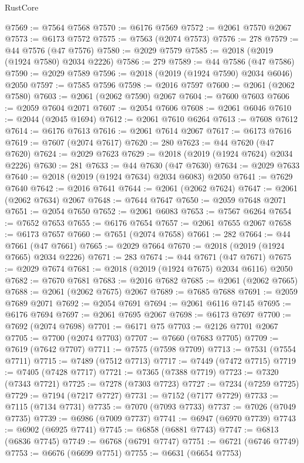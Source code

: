 \begin{lexlean}{RustCore}
\begin{coremodule}
@7569 := @7564 @7568
@7570 := @6176 @7569
@7572 := @2061 @7570 @2067
@7573 := @6173 @7572
@7575 := @7563 (@2074 @7573)
@7576 := 278
@7579 := @44 @7576 (@47 @7576)
@7580 := @2029 @7579
@7585 := @2018 (@2019 (@1924 @7580) @2034 @2226)
@7586 := 279
@7589 := @44 @7586 (@47 @7586)
@7590 := @2029 @7589
@7596 := @2018 (@2019 (@1924 @7590) @2034 @6046) @2050
@7597 := @7585 @7596
@7598 := @2016 @7597
@7600 := @2061 (@2062 @7580)
@7603 := @2061 (@2062 @7590) @2067
@7604 := @7600 @7603
@7606 := @2059 @7604 @2071
@7607 := @2054 @7606
@7608 := @2061 @6046
@7610 := @2044 (@2045 @1694)
@7612 := @2061 @7610 @6264
@7613 := @7608 @7612
@7614 := @6176 @7613
@7616 := @2061 @7614 @2067
@7617 := @6173 @7616
@7619 := @7607 (@2074 @7617)
@7620 := 280
@7623 := @44 @7620 (@47 @7620)
@7624 := @2029 @7623
@7629 := @2018 (@2019 (@1924 @7624) @2034 @2226)
@7630 := 281
@7633 := @44 @7630 (@47 @7630)
@7634 := @2029 @7633
@7640 := @2018 (@2019 (@1924 @7634) @2034 @6083) @2050
@7641 := @7629 @7640
@7642 := @2016 @7641
@7644 := @2061 (@2062 @7624)
@7647 := @2061 (@2062 @7634) @2067
@7648 := @7644 @7647
@7650 := @2059 @7648 @2071
@7651 := @2054 @7650
@7652 := @2061 @6083
@7653 := @7567 @6264
@7654 := @7652 @7653
@7655 := @6176 @7654
@7657 := @2061 @7655 @2067
@7658 := @6173 @7657
@7660 := @7651 (@2074 @7658)
@7661 := 282
@7664 := @44 @7661 (@47 @7661)
@7665 := @2029 @7664
@7670 := @2018 (@2019 (@1924 @7665) @2034 @2226)
@7671 := 283
@7674 := @44 @7671 (@47 @7671)
@7675 := @2029 @7674
@7681 := @2018 (@2019 (@1924 @7675) @2034 @6116) @2050
@7682 := @7670 @7681
@7683 := @2016 @7682
@7685 := @2061 (@2062 @7665)
@7688 := @2061 (@2062 @7675) @2067
@7689 := @7685 @7688
@7691 := @2059 @7689 @2071
@7692 := @2054 @7691
@7694 := @2061 @6116 @7145
@7695 := @6176 @7694
@7697 := @2061 @7695 @2067
@7698 := @6173 @7697
@7700 := @7692 (@2074 @7698)
@7701 := @6171 @75
@7703 := @2126 @7701 @2067
@7705 := @7700 (@2074 @7703)
@7707 := @7660 (@7683 @7705)
@7709 := @7619 (@7642 @7707)
@7711 := @7575 (@7598 @7709)
@7713 := @7531 (@7554 @7711)
@7715 := @7489 (@7512 @7713)
@7717 := @7449 (@7472 @7715)
@7719 := @7405 (@7428 @7717)
@7721 := @7365 (@7388 @7719)
@7723 := @7320 (@7343 @7721)
@7725 := @7278 (@7303 @7723)
@7727 := @7234 (@7259 @7725)
@7729 := @7194 (@7217 @7727)
@7731 := @7152 (@7177 @7729)
@7733 := @7115 (@7134 @7731)
@7735 := @7070 (@7093 @7733)
@7737 := @7026 (@7049 @7735)
@7739 := @6986 (@7009 @7737)
@7741 := @6947 (@6970 @7739)
@7743 := @6902 (@6925 @7741)
@7745 := @6858 (@6881 @7743)
@7747 := @6813 (@6836 @7745)
@7749 := @6768 (@6791 @7747)
@7751 := @6721 (@6746 @7749)
@7753 := @6676 (@6699 @7751)
@7755 := @6631 (@6654 @7753)

\end{coremodule}
\end{lexlean}
